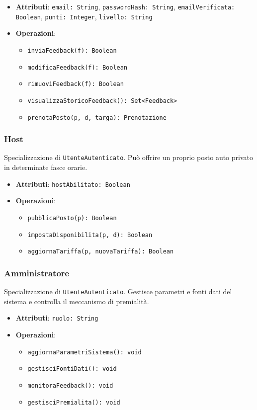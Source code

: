 \documentclass[12pt,a4paper]{article}
\begin{document}
\begin{itemize}
    \item \textbf{Attributi}: \texttt{email: String}, \texttt{passwordHash: String}, \texttt{emailVerificata: Boolean}, \texttt{punti: Integer}, \texttt{livello: String}
    \item \textbf{Operazioni}:
    \begin{itemize}
        \item \texttt{inviaFeedback(f): Boolean}
        \item \texttt{modificaFeedback(f): Boolean}
        \item \texttt{rimuoviFeedback(f): Boolean}
        \item \texttt{visualizzaStoricoFeedback(): Set<Feedback>}
        \item \texttt{prenotaPosto(p, d, targa): Prenotazione}
    \end{itemize}
\end{itemize}

\subsubsection{Host}
Specializzazione di \texttt{UtenteAutenticato}. Può offrire un proprio posto auto privato in determinate fasce orarie.

\begin{itemize}
    \item \textbf{Attributi}: \texttt{hostAbilitato: Boolean}
    \item \textbf{Operazioni}:
    \begin{itemize}
        \item \texttt{pubblicaPosto(p): Boolean}
        \item \texttt{impostaDisponibilita(p, d): Boolean}
        \item \texttt{aggiornaTariffa(p, nuovaTariffa): Boolean}
    \end{itemize}
\end{itemize}

\subsubsection{Amministratore}
Specializzazione di \texttt{UtenteAutenticato}. Gestisce parametri e fonti dati del sistema e controlla il meccanismo di premialità.

\begin{itemize}
    \item \textbf{Attributi}: \texttt{ruolo: String}
    \item \textbf{Operazioni}:
    \begin{itemize}
        \item \texttt{aggiornaParametriSistema(): void}
        \item \texttt{gestisciFontiDati(): void}
        \item \texttt{monitoraFeedback(): void}
        \item \texttt{gestisciPremialita(): void}
    \end{itemize}
\end{itemize}
\end{document}
